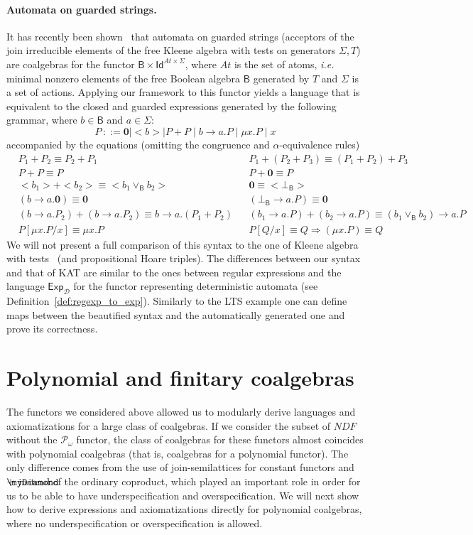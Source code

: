 \documentclass{LMCS}
\newcommand\D{\mathcal{D}}
\def\pow{{\mathcal P_{\!\!\!\omega}}}
\newcommand\Exp{\mathsf{Exp}}
\newcommand\ndf{\mathit{NDF}}
\newcommand\id{\mathsf{Id}}
\newcommand\B{\mathsf{B}}
\newcommand{\myplus}{\mathbin{\rlap{$\myDiamond$}\hspace*{.01cm}\raisebox{.14ex}{$+$}}}
\theoremstyle{definition}
\theoremstyle{plain}
\theoremstyle{plain}
\theoremstyle{plain}
\theoremstyle{plain}
\theoremstyle{definition}
\theoremstyle{definition}
\begin{document}
\paragraph{\textbf{Automata on guarded strings.}} It has recently been shown~\cite{kozen08} that automata on guarded
strings (acceptors of the join irreducible elements of the free Kleene algebra
with tests on generators $\Sigma, T$) are coalgebras for the functor
$\B\times \id^{At\times \Sigma}$, where $At$ is the set of 
atoms, {\em i.e.} minimal nonzero elements of the free Boolean algebra $\B$
generated by $T$ and $\Sigma$ is a set of actions.  Applying our framework to this functor yields a
language that is equivalent to the closed and guarded expressions
generated by the following grammar, where $b\in \B$ and $a\in \Sigma$:
\[
P\, ::= \mathbf{0} \mid <b> \mid P+P \mid b \to a.P \mid \mu x. P
\mid x
\]
accompanied by the equations (omitting the congruence and $\alpha$-equivalence rules)
\begin{align*}
&P_1 + P_2 \equiv P_2+P_1 && P_1 + (P_2+P_3) \equiv (P_1+P_2)+P_3\\
&P+P \equiv P&&P+ \mathbf{0} \equiv P \\ 
&<b_1>+<b_2> \equiv <b_1\vee_\B b_2> && \mathbf{0} \equiv <\bot_\B>\\
& (b \to a.\mathbf{0})\equiv  \mathbf{0} && (\bot_\B \to a.P) 
\equiv \mathbf{0}\\
& (b \to a.P_2) +  (b \to a.P_2) 
\equiv  b \to a.(P_1+P_2)&&
 (b_1 \to a.P) +  (b_2 \to a.P) \equiv  (b_1\vee_\B b_2) \to a.P\\
&P[\mu x.P/x] \equiv \mu x . P&&
P[Q/x] \equiv  Q \Rightarrow (\mu
x.P) \equiv Q
\end{align*}
We will not present a full comparison of this syntax to the one of Kleene algebra 
with tests~\cite{kozen08} (and propositional Hoare triples). The
differences between our syntax and that of KAT are similar to the ones
between regular expressions and the language $\Exp_\D$ for the functor
representing deterministic automata (see
Definition~\ref{def:regexp_to_exp}). 
Similarly to the LTS example one can define maps between the beautified syntax and the automatically generated one and prove its correctness. 


\section{Polynomial and finitary coalgebras}\label{sec:pol_fin}

The functors we considered above allowed us to modularly derive
languages and axiomatizations for a large class of coalgebras. If we
consider the subset of $\ndf$ without the $\pow$ functor, the class of
coalgebras for these functors almost coincides with polynomial
coalgebras (that is, coalgebras for a polynomial functor). The only
difference comes from the use of join-semilattices for constant
functors and $\myplus$ instead of the ordinary
coproduct, which played an important role in order for
us to be able to have underspecification and overspecification.  
We will next show how to derive expressions and axiomatizations
directly for polynomial coalgebras, where no underspecification or
overspecification is allowed. 
\end{document}
